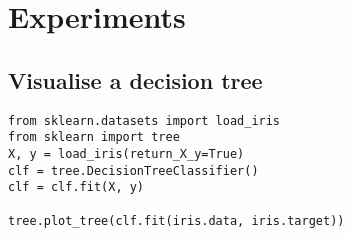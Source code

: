\documentclass[11pt]{article}
\begin{document}
\section{Experiments}
\label{sec:org25a6ddb}

\subsection{Visualise a decision tree}
\label{sec:org196b1cf}

\begin{verbatim}
from sklearn.datasets import load_iris
from sklearn import tree
X, y = load_iris(return_X_y=True)
clf = tree.DecisionTreeClassifier()
clf = clf.fit(X, y)

tree.plot_tree(clf.fit(iris.data, iris.target))
\end{verbatim}
\end{document}
